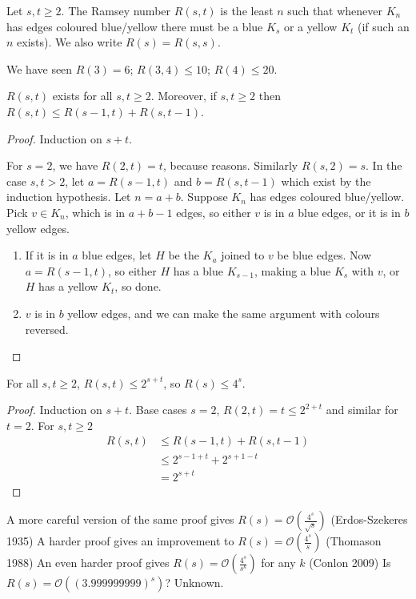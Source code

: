 \documentclass{article}
\begin{document}
\begin{defi}
    Let $s, t \geq 2$. The Ramsey number $R(s, t)$ is the least $n$ such that whenever $K_n$ has edges coloured blue/yellow there must be a blue $K_s$ or a yellow $K_t$ (if such an $n$ exists).
    We also write $R(s) = R(s, s)$.
\end{defi}

We have seen $R(3) = 6$; $R(3, 4) \leq 10$; $R(4) \leq 20$.

\begin{nthm}
    $R(s, t)$ exists for all $s, t \geq 2$.  Moreover, if $s, t \geq 2$ then $R(s, t) \leq R(s-1, t) + R(s, t-1)$.
\end{nthm}

\begin{proof}
    Induction on $s+t$.

    For $s=2$, we have $R(2, t) = t$, because reasons.  Similarly $R(s, 2) = s$.
    In the case $s, t > 2$, let $a = R(s-1, t)$ and $b = R(s, t-1)$ which exist by the induction hypothesis.  Let $n = a+b$. Suppose $K_n$ has edges coloured blue/yellow.
    Pick $v \in K_n$, which is in $a+b-1$ edges, so either $v$ is in $a$ blue edges, or it is in $b$ yellow edges.
    \begin{enumerate}
        \item If it is in $a$ blue edges, let $H$ be the $K_a$ joined to $v$ be blue edges.  Now $a = R(s-1, t)$, so either $H$ has a blue $K_{s-1}$, making a blue $K_s$ with $v$, or $H$ has a yellow $K_t$, so done.
        \item $v$ is in $b$ yellow edges, and we can make the same argument with colours reversed.
    \end{enumerate}
\end{proof}

\begin{cor}
    For all $s, t \geq 2$, $R(s, t) \leq 2^{s+t}$, so $R(s) \leq 4^s$.
\end{cor}

\begin{proof}
    Induction on $s + t$.  Base cases $s=2$, $R(2, t) = t \leq 2^{2+t}$ and similar for $t=2$.
    For $s, t \geq 2$
    \begin{align}
        R(s, t) &\leq R(s-1, t) + R(s, t-1) \\
                &\leq 2^{s-1+t} + 2^{s+1-t} \\
                &= 2^{s+t}
    \end{align}
\end{proof}

A more careful version of the same proof gives $R(s) = \mathcal{O} (\frac{4^s}{\sqrt{s}})$ (Erdos-Szekeres 1935)
A harder proof gives an improvement to $R(s) = \mathcal{O}(\frac{4^s}{s})$ (Thomason 1988)
An even harder proof gives $R(s) = \mathcal{O}(\frac{4^s}{s^k})$ for any $k$ (Conlon 2009)
Is $R(s) = \mathcal{O}((3.999999999)^s)$? Unknown.
\end{document}
